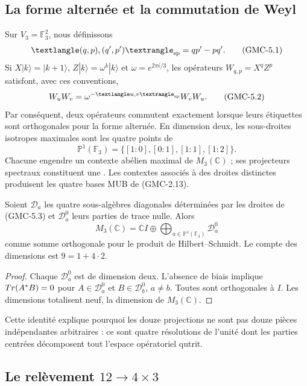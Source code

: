 \subsection{La forme alternée et la commutation de Weyl}

Sur $V_3=\mathbb F_3^2$, nous définissons
\[
 \langle(q,p),(q',p')\rangle_{\rm sp}=qp'-pq'.
 \tag{GMC-5.1}
\]
Si $X|k\rangle=|k+1\rangle$,
$Z|k\rangle=\omega^k|k\rangle$ et $\omega=e^{2\pi i/3}$, les opérateurs
$W_{q,p}=X^qZ^p$ satisfont, avec ces conventions,
\[
 W_uW_v=\omega^{-\langle u,v\rangle_{\rm sp}}W_vW_u.
 \tag{GMC-5.2}
\]
Par conséquent, deux opérateurs commutent exactement lorsque leurs étiquettes sont
orthogonales pour la forme alternée. En dimension deux, les sous-droites
isotropes maximales sont les quatre points de
\[
 \mathbb P^1(\mathbb F_3)=\{[1:0],[0:1],[1:1],[1:2]\}.
 \tag{GMC-5.3}
\]
Chacune engendre un contexte abélien maximal de $M_3(\mathbb C)$ ; ses
projecteurs spectraux constituent une \PVM. Les contextes associés à des droites
distinctes produisent les quatre bases MUB de \textup{(GMC-2.13)}.

\begin{proposition}
\label{p12-83-c2-s4:gmc:prop:descomposicion-masa-qutrit}
Soient $\mathcal D_a$ les quatre sous-algèbres diagonales déterminées par les
droites de \textup{(GMC-5.3)} et $\mathcal D_a^0$ leurs parties de trace nulle. Alors
\[
 M_3(\mathbb C)
 =\mathbb CI\oplus
   \bigoplus_{a\in\mathbb P^1(\mathbb F_3)}\mathcal D_a^0
 \tag{GMC-5.4}
\]
comme somme orthogonale pour le produit de Hilbert--Schmidt. Le compte des
dimensions est $9=1+4\cdot2$.
\end{proposition}

\begin{proof}
Chaque $\mathcal D_a^0$ est de dimension deux. L’absence de biais implique
$Tr(A^*B)=0$ pour $A\in\mathcal D_a^0$ et
$B\in\mathcal D_b^0$, $a\ne b$. Toutes sont orthogonales à $I$. Les
dimensions totalisent neuf, la dimension de $M_3(\mathbb C)$.
\end{proof}

Cette identité explique pourquoi les douze projections ne sont pas douze pièces
indépendantes arbitraires : ce sont quatre résolutions de l’unité dont les parties
centrées décomposent tout l’espace opératoriel qutrit.

\subsection{Le relèvement \texorpdfstring{$12\to4\times3$}{12 vers 4 fois 3}}

